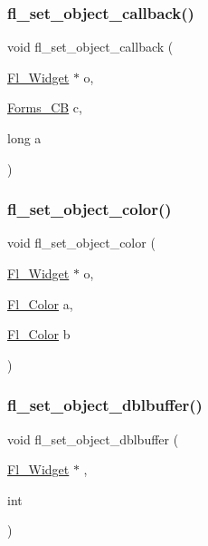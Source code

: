 \subsubsection{\texorpdfstring{fl\+\_\+set\+\_\+object\+\_\+callback()}{fl\_set\_object\_callback()}}
{\footnotesize\ttfamily void fl\+\_\+set\+\_\+object\+\_\+callback (\begin{DoxyParamCaption}\item[{\hyperlink{class_fl___widget}{Fl\+\_\+\+Widget} $\ast$}]{o,  }\item[{\hyperlink{forms_8_h_a93a9878bd5445be5505c060c990ed9e0}{Forms\+\_\+\+CB}}]{c,  }\item[{long}]{a }\end{DoxyParamCaption})\hspace{0.3cm}{\ttfamily [inline]}}

\mbox{\label{forms_8_h_a8fa2f1c3becc0bfdc865493832235212}} 
\subsubsection{\texorpdfstring{fl\+\_\+set\+\_\+object\+\_\+color()}{fl\_set\_object\_color()}}
{\footnotesize\ttfamily void fl\+\_\+set\+\_\+object\+\_\+color (\begin{DoxyParamCaption}\item[{\hyperlink{class_fl___widget}{Fl\+\_\+\+Widget} $\ast$}]{o,  }\item[{\hyperlink{_enumerations_8_h_a8b762953646f8abee866061f1af78a6a}{Fl\+\_\+\+Color}}]{a,  }\item[{\hyperlink{_enumerations_8_h_a8b762953646f8abee866061f1af78a6a}{Fl\+\_\+\+Color}}]{b }\end{DoxyParamCaption})\hspace{0.3cm}{\ttfamily [inline]}}

\mbox{\label{forms_8_h_a7445900d46aadb7d26444cc03a216a33}} 
\subsubsection{\texorpdfstring{fl\+\_\+set\+\_\+object\+\_\+dblbuffer()}{fl\_set\_object\_dblbuffer()}}
{\footnotesize\ttfamily void fl\+\_\+set\+\_\+object\+\_\+dblbuffer (\begin{DoxyParamCaption}\item[{\hyperlink{class_fl___widget}{Fl\+\_\+\+Widget} $\ast$}]{,  }\item[{int}]{ }\end{DoxyParamCaption})\hspace{0.3cm}{\ttfamily [inline]}}

